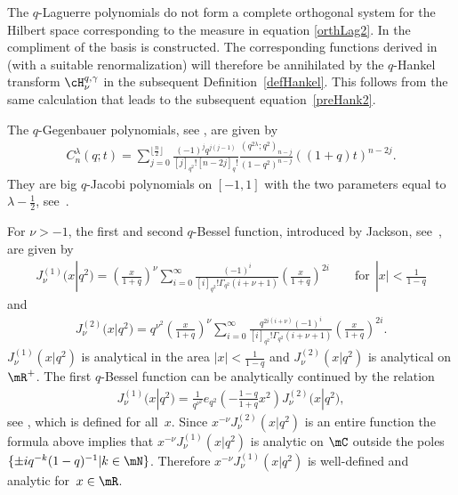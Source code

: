 \begin{remark}
The $q$-Laguerre polynomials do not form a complete orthogonal system for the Hilbert space corresponding to the measure in equation \eqref{orthLag2}. In \cite{MR1803885} the compliment of the basis is constructed. The corresponding functions derived in~\cite[Section~4]{MR1803885} (with a suitable renormalization) will therefore be annihilated by the $q$-Hankel transform $\cH_\nu^{q,\gamma}$ in the subsequent Def\/inition~\ref{defHankel}. This follows from the same calculation that leads to the subsequent equation~\eqref{preHank2}.
\end{remark}

The $q$-Gegenbauer polynomials, see \cite[equation~(2.19)]{MR1340930}, are given by
\begin{gather}
\label{qGeg}
C^\lambda_n(q;t)=\sum_{j=0}^{\lfloor\frac{n}{2}\rfloor}\frac{(-1)^jq^{j(j-1)}}{[j]_{q^2}![n-2j]_q!}
\frac{(q^{2\lambda};q^2)_{n-j}}{(1-q^2)^{n-j}}((1+q)t)^{n-2j}.
\end{gather}
They are big $q$-Jacobi polynomials on $[-1,1]$ with the two parameters equal to $\lambda-\frac{1}{2}$, see~\cite[equation~(2.26)]{MR1340930}.

For $\nu>-1$, the f\/irst and second $q$-Bessel function, introduced by Jackson, see~\cite{MR0649849, JACKSON}, are given by
\begin{gather}
\label{Bessel1}
J_\nu^{(1)}\big(x|q^2\big)=\left(\frac{x}{1+q}\right)^\nu\sum_{i=0}^\infty\frac{(-1)^i}{[i]_{q^2}!
\Gamma_{q^2}(i+\nu+1)}\left(\frac{x}{1+q}\right)^{2i} \qquad \mbox{for} \ \ |x|<\frac{1}{1-q}
\end{gather}
and
\begin{gather}
\label{Bessel2}
J_\nu^{(2)}\big(x|q^2\big)=q^{\nu^2}\left(\frac{x}{1+q}\right)^\nu\sum_{i=0}^\infty\frac{q^{2i(i+\nu)}(-1)^i}{[i]_{q^2}!
\Gamma_{q^2}(i+\nu+1)}\left(\frac{x}{1+q}\right)^{2i}.
\end{gather}
$J_\nu^{(1)}(x|q^2)$ is analytical in the area $|x|<\frac{1}{1-q}$ and $J_\nu^{(2)}(x|q^2)$ is analytical on $\mR^+$.
The f\/irst $q$-Bessel function can be analytically continued by the relation
\begin{gather*}
J_\nu^{(1)}\big(x|q^2\big) = \frac{1}{q^{\nu^2}}e_{q^2}\left(-\frac{1-q}{1+q}x^2\right)J_{\nu}^{(2)}\big(x|q^2\big),
\end{gather*}
see \cite[Exercise~1.24]{MR1052153}, which is def\/ined for all~$x$. Since $x^{-\nu}J_\nu^{(2)}(x|q^2)$ is an entire function the formula above implies that $x^{-\nu}J_\nu^{(1)}(x|q^2)$ is analytic on $\mC$ outside the poles $\{\pm i q^{-k}(1-q)^{-1}|k\in\mN\}$. Therefore $x^{-\nu}J_\nu^{(1)}(x|q^2)$ is well-def\/ined and analytic for~$x\in\mR$.



